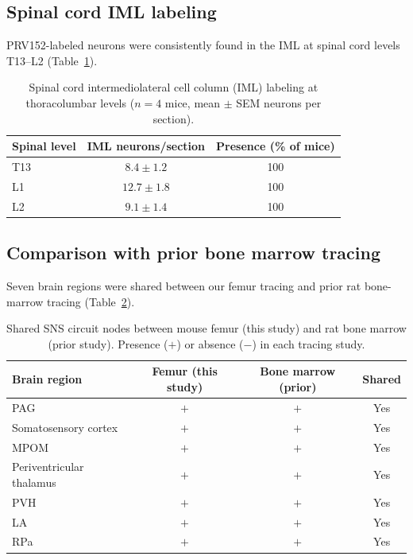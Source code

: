 \documentclass[11pt]{article}
\begin{document}
\subsection{Spinal cord IML labeling}

PRV152-labeled neurons were consistently found in the IML at spinal cord levels T13--L2 (Table~\ref{tab:iml}).

\begin{table}[H]
\centering
\caption{Spinal cord intermediolateral cell column (IML) labeling at thoracolumbar levels ($n = 4$ mice, mean $\pm$ SEM neurons per section).}
\label{tab:iml}
\begin{tabular}{lcc}
\toprule
\textbf{Spinal level} & \textbf{IML neurons/section} & \textbf{Presence (\% of mice)} \\
\midrule
T13 & $8.4 \pm 1.2$ & 100 \\
L1 & $12.7 \pm 1.8$ & 100 \\
L2 & $9.1 \pm 1.4$ & 100 \\
\bottomrule
\end{tabular}
\end{table}

\subsection{Comparison with prior bone marrow tracing}

Seven brain regions were shared between our femur tracing and prior rat bone-marrow tracing (Table~\ref{tab:comparison}).

\begin{table}[H]
\centering
\caption{Shared SNS circuit nodes between mouse femur (this study) and rat bone marrow (prior study). Presence ($+$) or absence ($-$) in each tracing study.}
\label{tab:comparison}
\begin{tabular}{lccc}
\toprule
\textbf{Brain region} & \textbf{Femur (this study)} & \textbf{Bone marrow (prior)} & \textbf{Shared} \\
\midrule
PAG & $+$ & $+$ & Yes \\
Somatosensory cortex & $+$ & $+$ & Yes \\
MPOM & $+$ & $+$ & Yes \\
Periventricular thalamus & $+$ & $+$ & Yes \\
PVH & $+$ & $+$ & Yes \\
LA & $+$ & $+$ & Yes \\
RPa & $+$ & $+$ & Yes \\
\bottomrule
\end{tabular}
\end{table}
\end{document}
